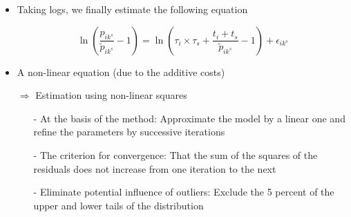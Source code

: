 \documentclass[10 pt,Helvetica, french]{beamer}
\begin{document}
\begin{frame}
\begin{itemize}
\item Taking logs, we finally estimate the following equation

\begin{equation}
\ln\left(\frac{p_{ik^s}}{\widetilde{p}_{ik^s}}-1 \right)= \ln \left(\tau_{i} \times \tau_{s}+\frac{t_{i} + t_{s}}{\widetilde{p}_{ik^s}}-1 \right) + \epsilon_{ik^s} \label{eq:est_equation}
\end{equation}
\vspace{0.1cm}
\item A non-linear equation (due to the additive costs)  \vspace{0.1cm}
\item[$\Rightarrow$] Estimation using non-linear squares \vspace{0.1cm}
\begin{itemize}
\item[-] At the basis of the method: Approximate the model by a linear one and refine the parameters by successive iterations \vspace{0.1cm}
\item[-] The criterion for convergence: That the sum of the squares of the residuals does not increase from one iteration to the next \vspace{0.1cm}
\item[-] Eliminate potential influence of outliers: Exclude the 5 percent of the upper and lower tails of the distribution 
\end{itemize}
\end{itemize}
\end{frame}
\end{document}
